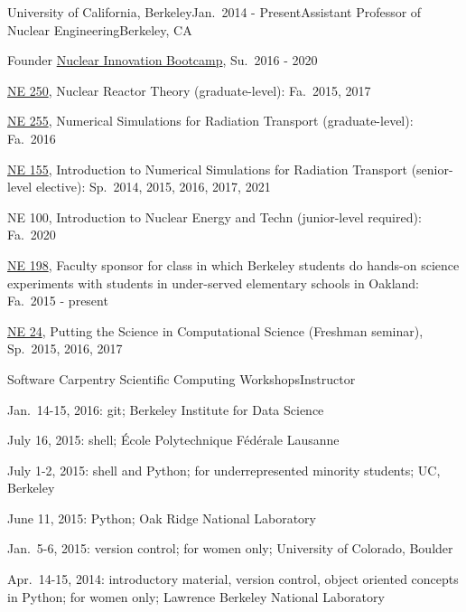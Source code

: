 \begin{rSubsection}{University of California, Berkeley}{Jan.\ 2014 - Present}{Assistant Professor of Nuclear Engineering}{Berkeley, CA}
\item Founder \href{http://nuclearinnovationalliance.org/bootcamp}{Nuclear
Innovation Bootcamp}, Su.\ 2016 - 2020 
\item \href{https://github.com/rachelslaybaugh/NE250 }{NE 250}, Nuclear Reactor Theory (graduate-level): Fa.\ 2015, 2017
\item \href{https://github.com/rachelslaybaugh/NE255}{NE 255}, Numerical Simulations for Radiation Transport (graduate-level): Fa.\ 2016
\item \href{https://github.com/rachelslaybaugh/NE155}{NE 155}, Introduction to
Numerical Simulations for Radiation Transport (senior-level elective): Sp.\
2014, 2015, 2016, 2017, 2021
\item NE 100, Introduction to Nuclear Energy and Techn (junior-level required):
Fa.\ 2020 
\item \href{http://soesberkeley.weebly.com/}{NE 198}, Faculty sponsor for class
in which Berkeley students do hands-on science experiments with students in
under-served elementary schools in Oakland: Fa.\ 2015 - present
\item \href{https://github.com/rachelslaybaugh/NE24}{NE 24}, Putting the Science in Computational Science (Freshman seminar), Sp.\ 2015, 2016, 2017
\end{rSubsection}


\begin{rSubsection}{Software Carpentry Scientific Computing Workshops}{}{Instructor}{}
\item Jan.\ 14-15, 2016: git; Berkeley Institute for Data Science
\item July 16, 2015: shell; \'{E}cole Polytechnique F\'{e}d\'{e}rale Lausanne
\item July 1-2, 2015: shell and Python; for underrepresented minority students; UC, Berkeley
\item June 11, 2015: Python; Oak Ridge National Laboratory
\item Jan.\ 5-6, 2015: version control; for women only; University of Colorado, Boulder
\item Apr.\ 14-15, 2014: introductory material, version control, object oriented concepts in Python; for women only; Lawrence Berkeley National Laboratory
\end{rSubsection}


